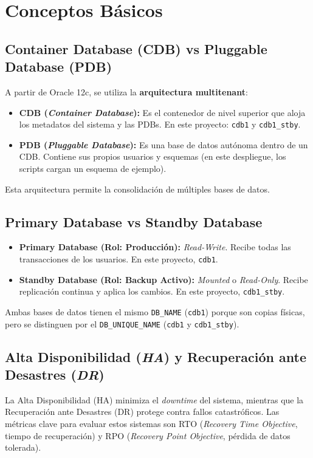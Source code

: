 \documentclass[11pt, a4paper]{report}
\begin{document}
\section{Conceptos Básicos}

\subsection{Container Database (CDB) vs Pluggable Database (PDB)}

A partir de Oracle 12c, se utiliza la \textbf{arquitectura multitenant}:
\begin{itemize}
    \item \textbf{CDB (\textit{Container Database}):} Es el contenedor de nivel superior que aloja los metadatos del sistema y las PDBs. En este proyecto: \texttt{cdb1} y \texttt{cdb1\_stby}.
    \item \textbf{PDB (\textit{Pluggable Database}):} Es una base de datos autónoma dentro de un CDB. Contiene sus propios usuarios y esquemas (en este despliegue, los scripts cargan un esquema de ejemplo).
\end{itemize}
Esta arquitectura permite la consolidación de múltiples bases de datos.

\subsection{Primary Database vs Standby Database}

\begin{itemize}
    \item \textbf{Primary Database (Rol: Producción):} \textit{Read-Write}.
Recibe todas las transacciones de los usuarios. En este proyecto, \texttt{cdb1}.
    \item \textbf{Standby Database (Rol: Backup Activo):} \textit{Mounted} o \textit{Read-Only}.
Recibe replicación continua y aplica los cambios. En este proyecto, \texttt{cdb1\_stby}.
\end{itemize}

Ambas bases de datos tienen el mismo \texttt{DB\_NAME} (\texttt{cdb1}) porque son copias físicas, pero se distinguen por el \texttt{DB\_UNIQUE\_NAME} (\texttt{cdb1} y \texttt{cdb1\_stby}).
\subsection{Alta Disponibilidad (\textit{HA}) y Recuperación ante Desastres (\textit{DR})}

La Alta Disponibilidad (HA) minimiza el \textit{downtime} del sistema, mientras que la Recuperación ante Desastres (DR) protege contra fallos catastróficos. Las métricas clave para evaluar estos sistemas son RTO (\textit{Recovery Time Objective}, tiempo de recuperación) y RPO (\textit{Recovery Point Objective}, pérdida de datos tolerada).
\end{document}
